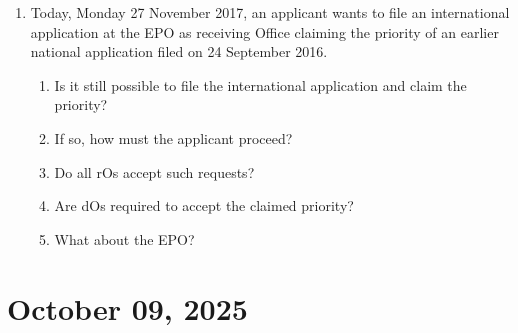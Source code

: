\documentclass{report}
\begin{document}
\begin{enumerate}[label=\textbf{Question \arabic*}]
\begin{enumerate}[label=(\alph*)]
     \end{enumerate}


\item %

Today, Monday 27 November 2017, an applicant wants to file an international application at the EPO as receiving Office claiming the priority of an earlier national application filed on 24 September 2016.

    \begin{enumerate}[label=(\alph*)]
        \item  Is it still possible to file the international application and claim the priority?
\item  If so, how must the applicant proceed?
\item Do all rOs accept such requests?

\item Are dOs required to accept the claimed priority?
\item What about the EPO?

     \end{enumerate}
       \end{enumerate}

       \section{October 09, 2025}
\end{document}

